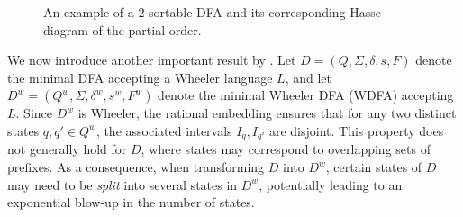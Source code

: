 \begin{example}
\begin{figure}[H]
\begin{subfigure}[b]{0.35\textwidth}
            \caption{}
            \label{fig:non_wheeler_graph_poset}
        \end{subfigure}
        \caption{An example of a $2$-sortable DFA and its corresponding Hasse diagram of the partial order.}
        \label{fig:non_wheeler_example}
    \end{figure}
\end{example}

We now introduce another important result by \cite{manziniRationalConstructionWheeler2024}. Let $D = (Q, \Sigma, \delta, s, F)$ denote the minimal DFA accepting a Wheeler language $L$, and let $D^w = (Q^w, \Sigma, \delta^w, s^w, F^w)$ denote the minimal Wheeler DFA (WDFA) accepting $L$. Since $D^w$ is Wheeler, the rational embedding ensures that for any two distinct states $q, q' \in Q^w$, the associated intervals $I_q, I_{q'}$ are disjoint. This property does not generally hold for $D$, where states may correspond to overlapping sets of prefixes. As a consequence, when transforming $D$ into $D^w$, certain states of $D$ may need to be \emph{split} into several states in $D^w$, potentially leading to an exponential blow-up in the number of states.

